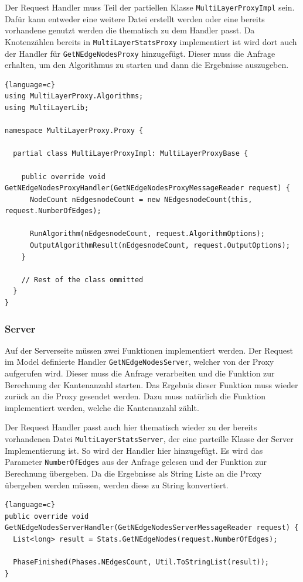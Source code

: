 Der Request Handler muss Teil der partiellen Klasse \verb|MultiLayerProxyImpl| sein. Dafür kann entweder eine weitere Datei erstellt werden oder eine bereits vorhandene genutzt werden die thematisch zu dem Handler passt.
Da Knotenzählen bereits in \verb|MultiLayerStatsProxy| implementiert ist wird dort auch der Handler für \verb|GetNEdgeNodesProxy| hinzugefügt. Dieser muss die Anfrage erhalten, um den Algorithmus zu starten und dann die Ergebnisse auszugeben.

\begin{lstlisting}{language=c}
using MultiLayerProxy.Algorithms;
using MultiLayerLib;

namespace MultiLayerProxy.Proxy {

  partial class MultiLayerProxyImpl: MultiLayerProxyBase {

    public override void GetNEdgeNodesProxyHandler(GetNEdgeNodesProxyMessageReader request) {
      NodeCount nEdgesnodeCount = new NEdgesnodeCount(this, request.NumberOfEdges);

      RunAlgorithm(nEdgesnodeCount, request.AlgorithmOptions);
      OutputAlgorithmResult(nEdgesnodeCount, request.OutputOptions);
    }
  
    // Rest of the class ommitted
  }
}
\end{lstlisting}



\subsubsection{Server}

Auf der Serverseite müssen zwei Funktionen implementiert werden. Der Request im Model definierte Handler \verb|GetNEdgeNodesServer|, welcher von der Proxy aufgerufen wird. Dieser muss die Anfrage verarbeiten und die Funktion zur Berechnung der Kantenanzahl starten. Das Ergebnis dieser Funktion muss wieder zurück an die Proxy gesendet werden.
Dazu muss natürlich die Funktion implementiert werden, welche die Kantenanzahl zählt.

Der Request Handler passt auch hier thematisch wieder zu der bereits vorhandenen Datei \verb|MultiLayerStatsServer|, der eine parteille Klasse der Server Implementierung ist. So wird der Handler hier hinzugefügt.
Es wird das Parameter \verb|NumberOfEdges| aus der Anfrage gelesen und der Funktion zur Berechnung übergeben. Da die Ergebnisse als String Liste an die Proxy übergeben werden müssen, werden diese zu String konvertiert.


\begin{lstlisting}{language=c}
public override void GetNEdgeNodesServerHandler(GetNEdgeNodesServerMessageReader request) {
  List<long> result = Stats.GetNEdgeNodes(request.NumberOfEdges);

  PhaseFinished(Phases.NEdgesCount, Util.ToStringList(result));
}
\end{lstlisting}

